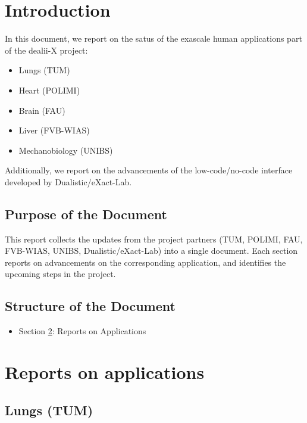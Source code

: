 \documentclass[a4paper,12pt]{article}
\begin{document}
\newpage

\tableofcontents %

\newpage

\section{{Introduction}}

In this document, we report on the satus of the exascale human applications part of the dealii-X project:
\begin{itemize}
    \item Lungs (TUM)
    \item Heart (POLIMI)
    \item Brain (FAU)
    \item Liver (FVB-WIAS)
    \item Mechanobiology (UNIBS)
\end{itemize}
Additionally, we report on the advancements of the low-code/no-code interface developed by Dualistic/eXact-Lab.

\subsection{{Purpose of the Document}}

This report collects the updates from the project partners (TUM, POLIMI, FAU, FVB-WIAS, UNIBS, Dualistic/eXact-Lab) into a single document. Each section reports on advancements on the corresponding application, and identifies the upcoming steps in the project.

\subsection{{Structure of the Document}}
\begin{itemize}
    \item Section \ref{sec:section2}: Reports on Applications
\end{itemize}

\newpage

\section{{Reports on applications}}
\label{sec:section2}

\subsection{Lungs (TUM)}
\end{document}
